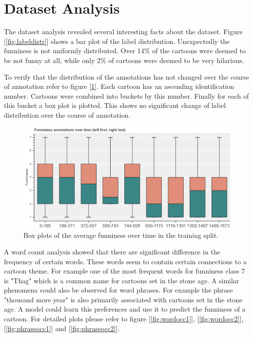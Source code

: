 \documentclass[draft,final,oneside]{vutinfth} %
\begin{document}
\section{Dataset Analysis}

The dataset analysis revealed several interesting facts about the dataset. Figure [\ref{fig:labeldistr}] shows a bar plot of the label distribution. Unexpectedly the funniness is not uniformly distributed. Over 14\% of the cartoons were deemed to be not funny at all, while only 2\% of cartoons were deemed to be very hilarious.

To verify that the distribution of the annotations has not changed over the course of annotation refer to figure [\ref{fig:boxplottime}]. Each cartoon has an ascending identification number. Cartoons were  combined into buckets by this number. Finally for each of this bucket a box plot is plotted. This shows no significant change of label distribution over the course of annotation.

\begin{figure}
	\centering
  	\includegraphics[width=1.0\textwidth]{graphics/average_funniness_over_time}
	\caption{Box plots of the average funniness over time in the training split.}
	\label{fig:boxplottime}
\end{figure}

A word count analysis showed that there are significant difference in the frequency of certain words. These words seem to contain certain connections to a cartoon theme. For example one of the most frequent words for funniness class 7 is "Thag" which is a common name for cartoons set in the stone age. A similar phenomena could also be observed for word phrases. For example the phrase "thousand more year" is also primarily associated with cartoons set in the stone age. A model could learn this preferences and use it to predict the funniness of a cartoon. For detailed plots please refer to figure [\ref{fig:wordocc1}], [\ref{fig:wordocc2}], [\ref{fig:phraseocc1}] and [\ref{fig:phraseocc2}].
\end{document}
